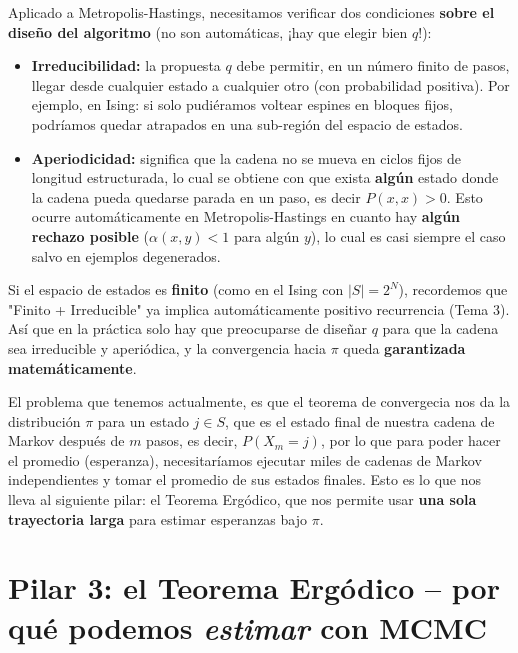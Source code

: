 \noindent
Aplicado a Metropolis-Hastings, necesitamos verificar dos condiciones \textbf{sobre el diseño del algoritmo} (no son automáticas, ¡hay que elegir bien $q$!):

\begin{itemize}
    \item \textbf{Irreducibilidad:} la propuesta $q$ debe permitir, en un número finito de pasos, llegar desde cualquier estado a cualquier otro (con probabilidad positiva). Por ejemplo, en Ising: si solo pudiéramos voltear espines en bloques fijos, podríamos quedar atrapados en una sub-región del espacio de estados.
    \item \textbf{Aperiodicidad:} significa que la cadena no se mueva en ciclos fijos de longitud estructurada, lo cual se obtiene con que exista \textbf{algún} estado donde la cadena pueda quedarse parada en un paso, es decir $P(x,x)>0$. Esto ocurre automáticamente en Metropolis-Hastings en cuanto hay \textbf{algún rechazo posible} ($\alpha(x,y)<1$ para algún $y$), lo cual es casi siempre el caso salvo en ejemplos degenerados.
\end{itemize}

\begin{observacion}
Si el espacio de estados es \textbf{finito} (como en el Ising con $|S|=2^N$), recordemos que "Finito + Irreducible" ya implica automáticamente positivo recurrencia (Tema 3). Así que en la práctica solo hay que preocuparse de diseñar $q$ para que la cadena sea irreducible y aperiódica, y la convergencia hacia $\pi$ queda \textbf{garantizada matemáticamente}. \\
\end{observacion}

\noindent
El problema que tenemos actualmente, es que el teorema de convergecia nos da la distribución $\pi$ para un estado $j\in S$, que es el estado final de nuestra cadena de Markov después de $m$ pasos, es decir, $P(X_m=j)$, por lo que para poder hacer el promedio (esperanza), necesitaríamos ejecutar miles de cadenas de Markov independientes y tomar el promedio de sus estados finales. Esto es lo que nos lleva al siguiente pilar: el Teorema Ergódico, que nos permite usar \textbf{una sola trayectoria larga} para estimar esperanzas bajo $\pi$.

\section{Pilar 3: el Teorema Ergódico -- por qué podemos \textit{estimar} con MCMC}

